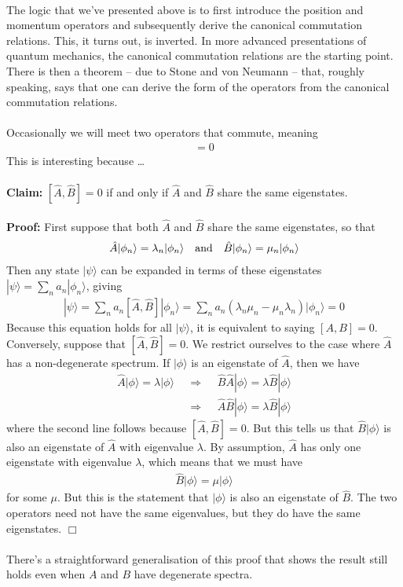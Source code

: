 \documentclass[12pt]{article}
\def\be{\begin{eqnarray}}
\def\ee{\end{eqnarray}}
\newcommand{\nn}{\nonumber}
\newcommand\para{\paragraph{}}
\newcommand{\ket}[1]{|#1\rangle}
\newcommand{\co}{\color{olive}}
\begin{document}
{\para
The logic that we've presented above is to first introduce the position and momentum operators and subsequently derive the canonical commutation relations. This, it turns out, is inverted. In more advanced presentations of quantum mechanics, the canonical commutation relations are the starting point. There is then a theorem -- due to Stone and von Neumann -- that, roughly speaking, says that one can derive the form of the operators  from the canonical commutation relations.



\para
{\co 
Occasionally we will meet two operators that commute, meaning
%
\be [\hat{A},\hat{B}]=0\nn\ee%
%
This is interesting because \ldots
%
\\ {\ }\\
%
{\bf Claim:} $[\hat{A},\hat{B}]=0$ if and only if $\hat{A}$ and $\hat{B}$ share the same eigenstates.
%
\\ {\ }\\
%
{\bf Proof:}  First suppose that both $\hat{A}$ and $\hat{B}$ share the same eigenstates, so that
%
\be \hat{A}\ket{\phi_n} = \lambda_n\ket{\phi_n}\ \ \ {\rm and}\ \ \ \hat{B}\ket{\phi_n} = \mu_n\ket{\phi_n}\nn\ee
%
Then any state $\ket{\psi}$ can be expanded in terms of these eigenstates $\ket{\psi}= \sum_na_n\ket{\phi_n}$, giving
%
\be[\hat{A},\hat{B}] \ket{\psi} = \sum_n a_n [\hat{A},\hat{B}]\ket{\phi_n} = \sum_n a_n (\lambda_n\mu_n-\mu_n\lambda_n)\ket{\phi_n}=0\nn\ee
%
Because this equation holds for all $\ket{\psi}$, it is equivalent to saying $[A,B]=0$. Conversely, suppose that $[\hat{A},\hat{B}]=0$. We restrict  ourselves to the case where $\hat{A}$ has a non-degenerate spectrum.  If $\ket{\phi}$ is an eigenstate of $\hat{A}$, then we have
%
\be \hat{A}\ket{\phi} = \lambda \ket{\phi} \ \ \ &\Longrightarrow&\ \ \ \hat{B}\hat{A}\ket{\phi} = \lambda\hat{B}\ket{\phi} \nn\\ 
&\Longrightarrow&\ \ \ \hat{A}\hat{B}\ket{\phi} = \lambda\hat{B}\ket{\phi}\nn\ee
%
where the second line follows because $[\hat{A},\hat{B}]=0$. But this tells us that $\hat{B}\ket{\phi}$ is also an eigenstate of $\hat{A}$ with eigenvalue $\lambda$. By assumption, $\hat{A}$ has only one eigenstate with eigenvalue $\lambda$, which means that we must have
%
\be \hat{B}\ket{\phi} = \mu\ket{\phi}\nn\ee
%
for some $\mu$. But this is the statement that $\ket{\phi}$ is also an eigenstate of $\hat{B}$. The two operators need not have the same eigenvalues, but they do have the same eigenstates.
\hfill $\Box$}


\para
There's a straightforward generalisation of this proof that shows the result still holds even when $A$ and $B$ have degenerate spectra.



}
\end{document}
